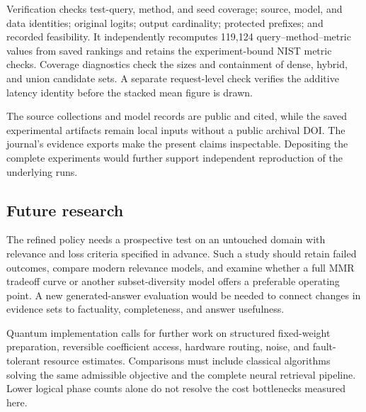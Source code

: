 Verification checks test-query, method, and seed coverage; source, model, and data identities; original logits; output cardinality; protected prefixes; and recorded feasibility. It independently recomputes 119,124 query--method--metric values from saved rankings and retains the experiment-bound NIST metric checks. Coverage diagnostics check the sizes and containment of dense, hybrid, and union candidate sets. A separate request-level check verifies the additive latency identity before the stacked mean figure is drawn.

The source collections and model records are public and cited, while the saved experimental artifacts remain local inputs without a public archival DOI. The journal's evidence exports make the present claims inspectable. Depositing the complete experiments would further support independent reproduction of the underlying runs.

\subsection{Future research}
The refined policy needs a prospective test on an untouched domain with relevance and loss criteria specified in advance. Such a study should retain failed outcomes, compare modern relevance models, and examine whether a full MMR tradeoff curve or another subset-diversity model offers a preferable operating point. A new generated-answer evaluation would be needed to connect changes in evidence sets to factuality, completeness, and answer usefulness.

Quantum implementation calls for further work on structured fixed-weight preparation, reversible coefficient access, hardware routing, noise, and fault-tolerant resource estimates. Comparisons must include classical algorithms solving the same admissible objective and the complete neural retrieval pipeline. Lower logical phase counts alone do not resolve the cost bottlenecks measured here.

